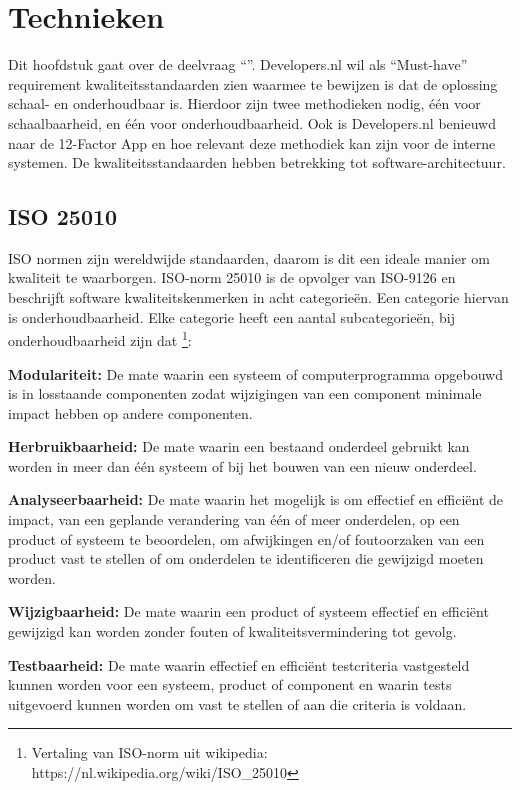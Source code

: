 \chapter{Technieken}

\label{Chapter3}

Dit hoofdstuk gaat over de deelvraag \enquote{\deeltechnieken}. Developers.nl wil als \enquote{Must-have} requirement kwaliteitsstandaarden zien waarmee te bewijzen is dat de oplossing schaal- en onderhoudbaar is. Hierdoor zijn twee methodieken nodig, één voor schaalbaarheid, en één voor onderhoudbaarheid. Ook is Developers.nl benieuwd naar de 12-Factor App en hoe relevant deze methodiek kan zijn voor de interne systemen. De kwaliteitsstandaarden hebben betrekking tot software-architectuur.

\section{ISO 25010}

ISO normen zijn wereldwijde standaarden, daarom is dit een ideale manier om kwaliteit te waarborgen. ISO-norm 25010 \parencite{ISO25010} is de opvolger van ISO-9126 en beschrijft software kwaliteitskenmerken in acht categorieën. Een categorie hiervan is onderhoudbaarheid. Elke categorie heeft een aantal subcategorieën, bij onderhoudbaarheid zijn dat \footnote{Vertaling van ISO-norm uit wikipedia: https://nl.wikipedia.org/wiki/ISO\_25010}:

\textbf{Modulariteit:} De mate waarin een systeem of computerprogramma opgebouwd is in losstaande componenten zodat wijzigingen van een component minimale impact hebben op andere componenten.

\textbf{Herbruikbaarheid:} De mate waarin een bestaand onderdeel gebruikt kan worden in meer dan één systeem of bij het bouwen van een nieuw onderdeel.

\textbf{Analyseerbaarheid:} De mate waarin het mogelijk is om effectief en efficiënt de impact, van een geplande verandering van één of meer onderdelen, op een product of systeem te beoordelen, om afwijkingen en/of foutoorzaken van een product vast te stellen of om onderdelen te identificeren die gewijzigd moeten worden.

\textbf{Wijzigbaarheid:} De mate waarin een product of systeem effectief en efficiënt gewijzigd kan worden zonder fouten of kwaliteitsvermindering tot gevolg.

\textbf{Testbaarheid:} De mate waarin effectief en efficiënt testcriteria vastgesteld kunnen worden voor een systeem, product of component en waarin tests uitgevoerd kunnen worden om vast te stellen of aan die criteria is voldaan.

